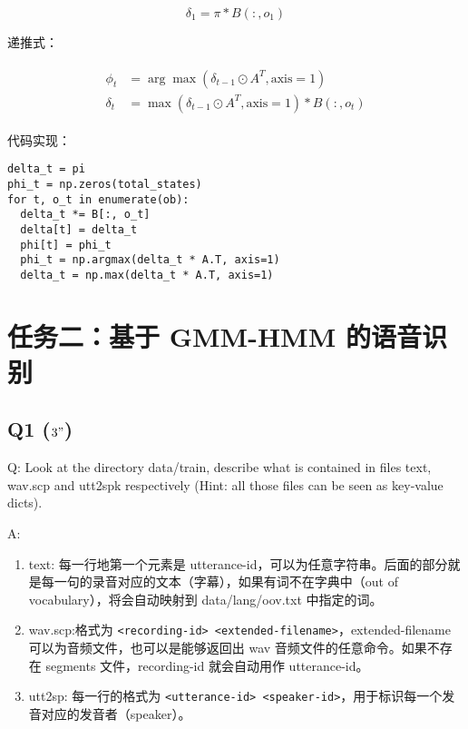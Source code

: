 \documentclass[degree=project, degree-type=project]{thuthesis}
\begin{document}
\begin{equation}
  \delta_1 = \pi * B(:, o_1)
\end{equation}

递推式：

\begin{align}
  \begin{split}
    \phi_t &= \arg \max(\delta_{t-1} \odot A^T, \text{axis}=1) \\
    \delta_t &= \max(\delta_{t-1} \odot A^T, \text{axis}=1) * B(:, o_t)
  \end{split}
\end{align}

代码实现：

  \begin{verbatim}
delta_t = pi
phi_t = np.zeros(total_states)
for t, o_t in enumerate(ob):
  delta_t *= B[:, o_t]
  delta[t] = delta_t
  phi[t] = phi_t
  phi_t = np.argmax(delta_t * A.T, axis=1)
  delta_t = np.max(delta_t * A.T, axis=1)
  \end{verbatim}

\chapter{任务二：基于 GMM-HMM 的语音识别}

\section{Q1 ($3"$)}

Q: Look at the directory data/train, describe what is contained in files text, wav.scp and utt2spk respectively (Hint: all those files can be seen as key-value dicts).

A:

\begin{enumerate}
  \item text: 每一行地第一个元素是 utterance-id，可以为任意字符串。后面的部分就是每一句的录音对应的文本（字幕），如果有词不在字典中（out of vocabulary），将会自动映射到 data/lang/oov.txt 中指定的词。
  \item wav.scp:格式为 \texttt{<recording-id> <extended-filename>}，extended-filename 可以为音频文件，也可以是能够返回出 wav 音频文件的任意命令。如果不存在 segments 文件，recording-id 就会自动用作 utterance-id。
  \item utt2sp: 每一行的格式为 \texttt{<utterance-id> <speaker-id>}，用于标识每一个发音对应的发音者（speaker）。
\end{enumerate}
\end{document}
